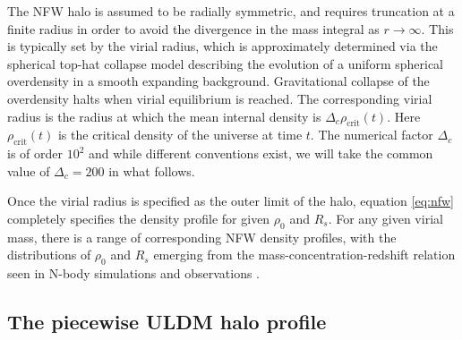 \documentclass{pasa}%
\begin{document}
The NFW halo is assumed to be radially symmetric, and requires truncation at a finite radius in order to avoid the divergence in the mass integral as $r\rightarrow \infty$. This is typically set by the virial radius, which is approximately determined via the spherical top-hat collapse model \cite{White:2000jv, Suto:2015jdt, Herrera:2017epn} describing the evolution of a uniform spherical overdensity in a smooth expanding background. Gravitational collapse of the overdensity halts when virial equilibrium is reached. The corresponding virial radius is the radius at which the mean internal density is $\Delta_c \rho_\mathrm{crit}(t)$. Here $\rho_\mathrm{crit}(t)$ is the critical density of the universe at time $t$. The numerical factor $\Delta_c$ is of order $10^2$ and while different conventions exist, we will take the common value of $\Delta_c = 200$ \cite{Richings:2018} in what follows. 

Once the virial radius is specified as the outer limit of the halo, equation \ref{eq:nfw} completely specifies the density profile for given  $\rho_0$ and $R_s$. For any given virial mass, there is a range of corresponding NFW density profiles, with the distributions of $\rho_0$ and $R_s$ emerging from the mass-concentration-redshift relation seen in N-body simulations and observations \cite{Ludlow:2013vxa, Ragagnin:2018enf}. 

\subsection{The piecewise ULDM halo profile}
\end{document}
